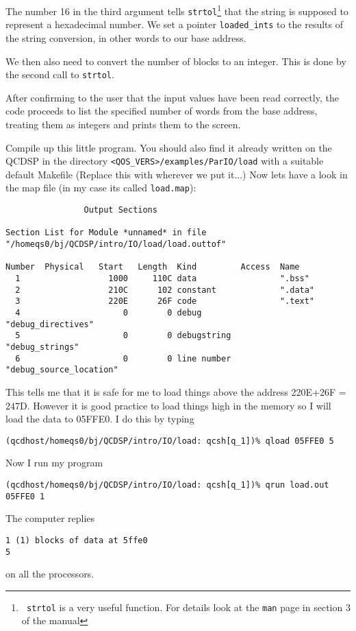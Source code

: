 The number 16 in the third argument tells {\tt strtol}\footnote{{\tt
strtol} is a very useful function. For details look at the {\tt man}
page in section 3 of the manual} that the string is supposed to
represent a hexadecimal number. We set a pointer {\tt loaded\_ints} to
the results of the string conversion, in other words to our base
address.

We then also need to convert the number of blocks to an integer. This is
done by the second call to {\tt strtol}. 

After confirming to the user that the input values have been read correctly,
the code proceeds to list the specified number of words from the base 
address, treating them as integers and prints them to the screen.

Compile up this little program. You should also find it already written
on the QCDSP in the directory {\tt <QOS\_VERS>/examples/ParIO/load} with
a suitable default Makefile (Replace this with wherever we put it...)
Now lets have a look in the map file (in my case its called {\tt load.map}):
{\scriptsize
\begin{verbatim}
                Output Sections

Section List for Module *unnamed* in file
"/homeqs0/bj/QCDSP/intro/IO/load/load.outtof"

Number  Physical   Start   Length  Kind         Access  Name
  1                  1000     110C data                 ".bss"
  2                  210C      102 constant             ".data"
  3                  220E      26F code                 ".text"
  4                     0        0 debug                "debug_directives"
  5                     0        0 debugstring          "debug_strings"
  6                     0        0 line number          "debug_source_location"
\end{verbatim}
}
This tells me that it is safe for me to load things above the address 220E+26F = 247D. However it is good practice to load things high in the memory so I will
load the data to 05FFE0. I do this by typing
\begin{verbatim}
(qcdhost/homeqs0/bj/QCDSP/intro/IO/load: qcsh[q_1])% qload 05FFE0 5
\end{verbatim}
Now I run my program 
\begin{verbatim}
(qcdhost/homeqs0/bj/QCDSP/intro/IO/load: qcsh[q_1])% qrun load.out 05FFE0 1
\end{verbatim}
The computer replies
\begin{verbatim}
1 (1) blocks of data at 5ffe0
5 
\end{verbatim}
on all the processors.

